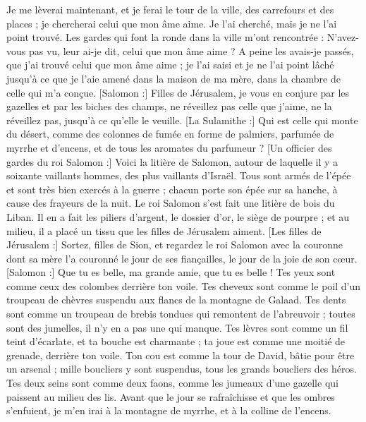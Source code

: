 \begin{multicols}{2}
Je me lèverai maintenant, et je ferai le tour de la ville, des carrefours et des places ; je chercherai celui que mon âme aime. Je l'ai cherché, mais je ne l'ai point trouvé.
Les gardes qui font la ronde dans la ville m'ont rencontrée : N'avez-vous pas vu, leur ai-je dit, celui que mon âme aime ?
A peine les avais-je passés, que j’ai trouvé celui que mon âme aime ; je l’ai saisi et je ne l’ai point lâché jusqu’à ce que je l'aie amené dans la maison de ma mère, dans la chambre de celle qui m'a conçue.
[Salomon :] Filles de Jérusalem, je vous en conjure par les gazelles et par les biches des champs, ne réveillez pas celle que j'aime, ne la réveillez pas, jusqu'à ce qu'elle le veuille.
[La Sulamithe :] Qui est celle qui monte du désert, comme des colonnes de fumée en forme de palmiers, parfumée de myrrhe et d'encens, et de tous les aromates du parfumeur ?
[Un officier des gardes du roi Salomon :] Voici la litière de Salomon, autour de laquelle il y a soixante vaillants hommes, des plus vaillants d'Israël.
Tous sont armés de l'épée et sont très bien exercés à la guerre ; chacun porte son épée sur sa hanche, à cause des frayeurs de la nuit.
Le roi Salomon s'est fait une litière de bois du Liban.
Il en a fait les piliers d’argent, le dossier d’or, le siège de pourpre ; et au milieu, il a placé un tissu que les filles de Jérusalem aiment.
[Les filles de Jérusalem :] Sortez, filles de Sion, et regardez le roi Salomon avec la couronne dont sa mère l'a couronné le jour de ses fiançailles, le jour de la joie de son cœur.
\VerseOne{}[Salomon :] Que tu es belle, ma grande amie, que tu es belle ! Tes yeux sont comme ceux des colombes derrière ton voile. Tes cheveux sont comme le poil d'un troupeau de chèvres suspendu aux flancs de la montagne de Galaad.
Tes dents sont comme un troupeau de brebis tondues qui remontent de l’abreuvoir ; toutes sont des jumelles, il n’y en a pas une qui manque.
Tes lèvres sont comme un fil teint d’écarlate, et ta bouche est charmante ; ta joue est comme une moitié de grenade, derrière ton voile.
Ton cou est comme la tour de David, bâtie pour être un arsenal ; mille boucliers y sont suspendus, tous les grands boucliers des héros.
Tes deux seins sont comme deux faons, comme les jumeaux d'une gazelle qui paissent au milieu des lis.
Avant que le jour se rafraîchisse et que les ombres s'enfuient, je m'en irai à la montagne de myrrhe, et à la colline de l'encens.

\end{multicols}
